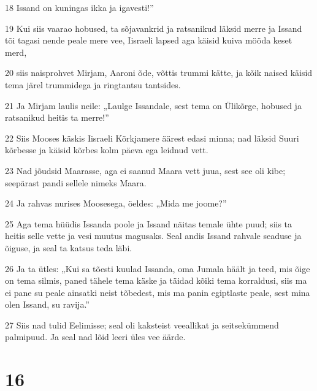 \par 18 Issand on kuningas ikka ja igavesti!”
\par 19 Kui siis vaarao hobused, ta sõjavankrid ja ratsanikud läksid merre ja Issand tõi tagasi nende peale mere vee, Iisraeli lapsed aga käisid kuiva mööda keset merd,
\par 20 siis naisprohvet Mirjam, Aaroni õde, võttis trummi kätte, ja kõik naised käisid tema järel trummidega ja ringtantsu tantsides.
\par 21 Ja Mirjam laulis neile: „Laulge Issandale, sest tema on Ülikõrge, hobused ja ratsanikud heitis ta merre!”
\par 22 Siis Mooses käskis Iisraeli Kõrkjamere äärest edasi minna; nad läksid Suuri kõrbesse ja käisid kõrbes kolm päeva ega leidnud vett.
\par 23 Nad jõudsid Maarasse, aga ei saanud Maara vett juua, sest see oli kibe; seepärast pandi sellele nimeks Maara.
\par 24 Ja rahvas nurises Moosesega, öeldes: „Mida me joome?”
\par 25 Aga tema hüüdis Issanda poole ja Issand näitas temale ühte puud; siis ta heitis selle vette ja vesi muutus magusaks. Seal andis Issand rahvale seaduse ja õiguse, ja seal ta katsus teda läbi.
\par 26 Ja ta ütles: „Kui sa tõesti kuulad Issanda, oma Jumala häält ja teed, mis õige on tema silmis, paned tähele tema käske ja täidad kõiki tema korraldusi, siis ma ei pane su peale ainsatki neist tõbedest, mis ma panin egiptlaste peale, sest mina olen Issand, su ravija.”
\par 27 Siis nad tulid Eelimisse; seal oli kaksteist veeallikat ja seitsekümmend palmipuud. Ja seal nad lõid leeri üles vee äärde.

\chapter{16}

